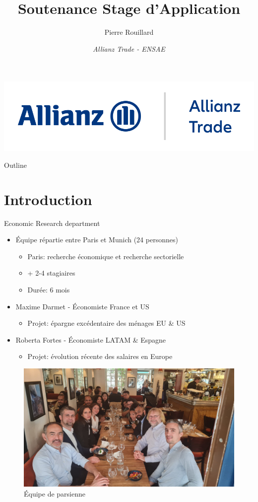 \documentclass[9pt, xcolor={dvipsnames}]{beamer}
\author{Pierre Rouillard}
\title{Soutenance Stage d'Application}
\institute{xx/xx/xxxx \\ Maître de stage: Françoise Huang}
\date{\textit{Allianz Trade - ENSAE}}
\begin{document}
\begin{frame}[plain]
\titlepage
\centering
\includegraphics[width=.5\textwidth]{Allianz_Trade.png}
\end{frame}

\begin{frame}{Outline}
  \tableofcontents
\end{frame}

\section{Introduction}
\begin{frame}[label=intro]{Economic Research department}
\begin{itemize}
\item Équipe répartie entre Paris et Munich (24 personnes)\\
   \begin{itemize}
    \item Paris: recherche économique et recherche sectorielle
    \item + 2-4 stagiaires
    \item Durée: 6 mois
   \end{itemize}
\item Maxime Darmet - Économiste France et US
  \begin{itemize}
    \item Projet: épargne excédentaire des ménages EU \& US
  \end{itemize}
\item Roberta Fortes - Économiste LATAM \& Espagne
  \begin{itemize}
    \item Projet: évolution récente des salaires en Europe
  \end{itemize}
\end{itemize}
\begin{figure}
  \centering
  \includegraphics[width=.6\textwidth]{img/team.JPG}
  \caption{Équipe de parsienne}
\end{figure}
\end{frame}
\end{document}

